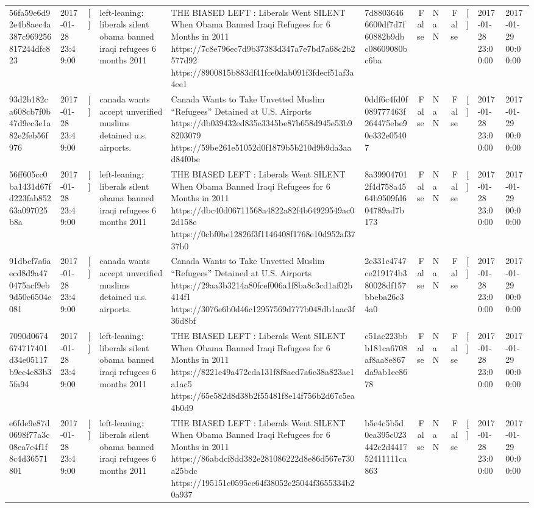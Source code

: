 \begin{tabular}{llllllrlrlll}
56fa59e6d92e4b8aec4a387c969256817244dfc823 & 2017-01-28 23:49:00 & [] & left-leaning: liberals silent obama banned iraqi refugees 6 months 2011 & THE BIASED LEFT : Liberals Went SILENT When Obama Banned Iraqi Refugees for 6 Months in 2011 https://7c8e796ec7d9b37383d347a7e7bd7a68c2b2577d92 https://8900815b883df41fce0dab091f3fdecf51af3a4ee1 & 7d88036466600df7d7f60882b9dbc08609080bc6ba & False & NaN & False & [] & 2017-01-28 23:00:00 & 2017-01-29 00:00:00 \\
93d2b182ca608cb7f0b47d9ec3e1a82e2feb56f976 & 2017-01-28 23:49:00 & [] & canada wants accept unverified muslims detained u.s. airports. & Canada Wants to Take Unvetted Muslim “Refugees” Detained at U.S. Airports https://db039432ed835e3345be87b658d945e53b98203079 https://59be261e51052d0f1879b5b210d9b9da3aad84f0be & 0ddf6c4fd0f089777463f264475ebe90e332e05407 & False & NaN & False & [] & 2017-01-28 23:00:00 & 2017-01-29 00:00:00 \\
56ff605cc0ba1431d67fd223fab85263a097025b8a & 2017-01-28 23:49:00 & [] & left-leaning: liberals silent obama banned iraqi refugees 6 months 2011 & THE BIASED LEFT : Liberals Went SILENT When Obama Banned Iraqi Refugees for 6 Months in 2011 https://dbc40d06711568a4822a82f4b64929549ac02d158e https://0cbf0be12826f3f1146408f1768e10d952af3737b0 & 8a399047012f4d758a4564b9509fd604789ad7b173 & False & NaN & False & [] & 2017-01-28 23:00:00 & 2017-01-29 00:00:00 \\
91dbcf7a6aecd8d9a470475acf9eb9d50e6504e081 & 2017-01-28 23:49:00 & [] & canada wants accept unverified muslims detained u.s. airports. & Canada Wants to Take Unvetted Muslim “Refugees” Detained at U.S. Airports https://29aa3b3214a80fcef006a1f8ba8c3cd1af02b414f1 https://3076e6b0d46c12957569d777b048db1aac3f36d8bf & 2c331c4747ce219174b380028df157bbeba26c34a0 & False & NaN & False & [] & 2017-01-28 23:00:00 & 2017-01-29 00:00:00 \\
7090d0674674717401d34e05117b9ec4c83b35fa94 & 2017-01-28 23:49:00 & [] & left-leaning: liberals silent obama banned iraqi refugees 6 months 2011 & THE BIASED LEFT : Liberals Went SILENT When Obama Banned Iraqi Refugees for 6 Months in 2011 https://8221e49a472cda131f8f8aed7a6c38a823ae1a1ac5 https://65e582d8d38b2f55481f8e14f756b2d67c5ea4b0d9 & c51ac223bbb181ca6708af8aa8e867da9ab1ee8678 & False & NaN & False & [] & 2017-01-28 23:00:00 & 2017-01-29 00:00:00 \\
e6fde9e87d0698f77a3c08ea7e4f1f8c4d36571801 & 2017-01-28 23:49:00 & [] & left-leaning: liberals silent obama banned iraqi refugees 6 months 2011 & THE BIASED LEFT : Liberals Went SILENT When Obama Banned Iraqi Refugees for 6 Months in 2011 https://86abdcf8dd382e281086222d8e86d567e730a25bdc https://195151c0595ce64f38052c25044f3655334b20a937 & b5e4c5b5d0ea395c023442c2d441752411111ca863 & False & NaN & False & [] & 2017-01-28 23:00:00 & 2017-01-29 00:00:00 \\

\end{tabular}
